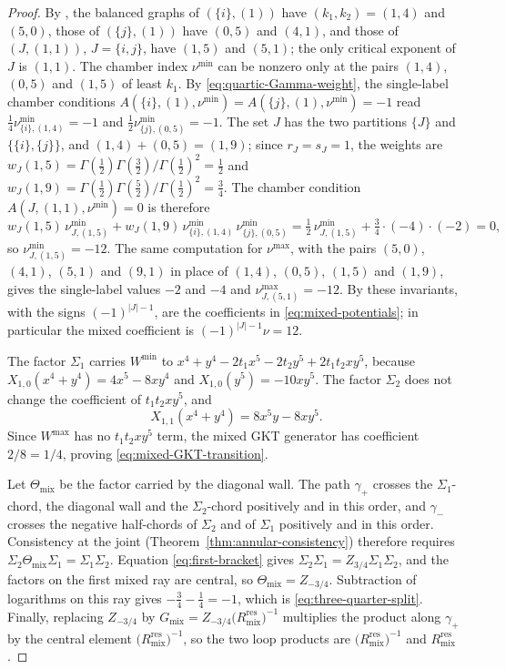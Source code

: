 \begin{proof}
By \cite[Notation~2.40]{grossetal2022open}, the balanced graphs of
$(\{i\},(1))$ have $(k_1,k_2)=(1,4)$ and $(5,0)$, those of $(\{j\},(1))$
have $(0,5)$ and $(4,1)$, and those of $(J,(1,1))$, $J=\{i,j\}$, have
$(1,5)$ and $(5,1)$; the only critical exponent of $J$ is $(1,1)$.  The
chamber index $\nu^{\min}$ can be nonzero only at the pairs $(1,4)$, $(0,5)$
and $(1,5)$ of least $k_1$.  By \eqref{eq:quartic-Gamma-weight}, the
single-label chamber conditions $A(\{i\},(1),\nu^{\min})=
A(\{j\},(1),\nu^{\min})=-1$ read
$\frac14\nu^{\min}_{\{i\},(1,4)}=-1$ and $\frac12\nu^{\min}_{\{j\},(0,5)}=-1$.
The set $J$ has the two partitions $\{J\}$ and $\{\{i\},\{j\}\}$, and
$(1,4)+(0,5)=(1,9)$; since $r_J=s_J=1$, the weights are
$w_J(1,5)=\Gamma(\frac12)\Gamma(\frac32)/\Gamma(\frac12)^2=\frac12$ and
$w_J(1,9)=\Gamma(\frac12)\Gamma(\frac52)/\Gamma(\frac12)^2=\frac34$.  The
chamber condition $A(J,(1,1),\nu^{\min})=0$
\cite[Def.~3.47(3) and Notation~3.42]{grossetal2022open} is therefore
\[
 w_J(1,5)\,\nu^{\min}_{J,(1,5)}
 +w_J(1,9)\,\nu^{\min}_{\{i\},(1,4)}\,\nu^{\min}_{\{j\},(0,5)}
 =\tfrac12\,\nu^{\min}_{J,(1,5)}+\tfrac34\cdot(-4)\cdot(-2)=0,
\]
so $\nu^{\min}_{J,(1,5)}=-12$.  The same computation for $\nu^{\max}$, with
the pairs $(5,0)$, $(4,1)$, $(5,1)$ and $(9,1)$ in place of $(1,4)$, $(0,5)$,
$(1,5)$ and $(1,9)$, gives the single-label values $-2$ and $-4$ and
$\nu^{\max}_{J,(5,1)}=-12$.  By \cite[Def.~4.6]{grossetal2022open} these
invariants, with the signs $(-1)^{|J|-1}$, are the coefficients in
\eqref{eq:mixed-potentials}; in particular the mixed coefficient is
$(-1)^{|J|-1}\nu=12$.

The factor $\Sigma_1$ carries $W^{\min}$ to
$x^4+y^4-2t_1x^5-2t_2y^5+2t_1t_2xy^5$, because
$X_{1,0}(x^4+y^4)=4x^5-8xy^4$ and $X_{1,0}(y^5)=-10xy^5$.  The factor
$\Sigma_2$ does not change the coefficient of $t_1t_2xy^5$, and
\[
 X_{1,1}(x^4+y^4)=8x^5y-8xy^5.
\]
Since $W^{\max}$ has no $t_1t_2xy^5$ term, the mixed GKT generator has
coefficient $2/8=1/4$, proving \eqref{eq:mixed-GKT-transition}.

Let $\Theta_{\mathrm{mix}}$ be the factor carried by the diagonal wall.  The
path $\gamma_+$ crosses the $\Sigma_1$-chord, the diagonal wall and the
$\Sigma_2$-chord positively and in this order, and $\gamma_-$ crosses the
negative half-chords of $\Sigma_2$ and of $\Sigma_1$ positively and in this
order.  Consistency at the joint (Theorem~\ref{thm:annular-consistency})
therefore requires $\Sigma_2\Theta_{\mathrm{mix}}\Sigma_1=\Sigma_1\Sigma_2$.
Equation \eqref{eq:first-bracket} gives
$\Sigma_2\Sigma_1=Z_{3/4}\Sigma_1\Sigma_2$, and the factors on the first
mixed ray are central, so $\Theta_{\mathrm{mix}}=Z_{-3/4}$.  Subtraction of logarithms on
this ray gives $-\frac34-\frac14=-1$, which is \eqref{eq:three-quarter-split}.
Finally, replacing $Z_{-3/4}$ by
$G_{\mathrm{mix}}=Z_{-3/4}\bigl(R^{\mathrm{res}}_{\mathrm{mix}}\bigr)^{-1}$ multiplies the product along
$\gamma_+$ by the central element $\bigl(R^{\mathrm{res}}_{\mathrm{mix}}\bigr)^{-1}$, so the two loop
products are $\bigl(R^{\mathrm{res}}_{\mathrm{mix}}\bigr)^{-1}$ and $R^{\mathrm{res}}_{\mathrm{mix}}$.
\end{proof}

